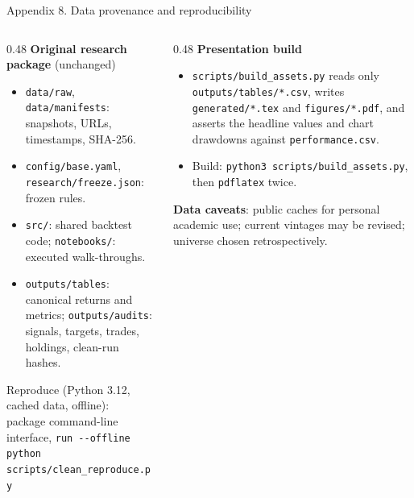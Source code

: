 \documentclass[aspectratio=169,11pt]{beamer}
\begin{document}
\begin{frame}[t]{Appendix 8. Data provenance and reproducibility}
\footnotesize
\begin{columns}[T,onlytextwidth]
\begin{column}{0.48\textwidth}
\textbf{Original research package} (unchanged)
\begin{itemize}\itemsep1pt
\item \texttt{data/raw}, \texttt{data/manifests}: snapshots, URLs, timestamps, SHA-256.
\item \texttt{config/base.yaml}, \texttt{research/freeze.json}: frozen rules.
\item \texttt{src/}: shared backtest code; \texttt{notebooks/}: executed walk-throughs.
\item \texttt{outputs/tables}: canonical returns and metrics; \texttt{outputs/audits}: signals, targets, trades, holdings, clean-run hashes.
\end{itemize}
\vskip0.1cm
Reproduce (Python 3.12, cached data, offline):\\
package command-line interface, \texttt{run -{}-offline}\\
\texttt{python scripts/clean\_reproduce.py}
\end{column}
\begin{column}{0.48\textwidth}
\textbf{Presentation build}
\begin{itemize}\itemsep1pt
\item \texttt{scripts/build\_assets.py} reads only \texttt{outputs/tables/*.csv}, writes \texttt{generated/*.tex} and \texttt{figures/*.pdf}, and asserts the headline values and chart drawdowns against \texttt{performance.csv}.
\item Build: \texttt{python3 scripts/build\_assets.py}, then \texttt{pdflatex} twice.
\end{itemize}
\vskip0.1cm
\textbf{Data caveats}: public caches for personal academic use; current vintages may be revised; universe chosen retrospectively.
\end{column}
\end{columns}
\end{frame}
\end{document}
